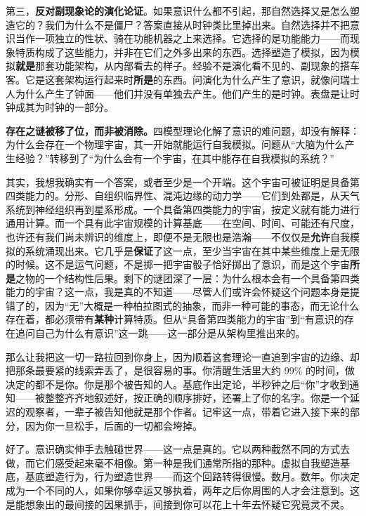 \documentclass[11pt, twoside, openright]{book}
\begin{document}
第三，\textbf{反对副现象论的演化论证}。如果意识什么都不引起，那自然选择又是怎么塑造它的？我们为什么不是僵尸？答案直接从时钟类比里掉出来。自然选择并不把意识当作一项独立的性状、骑在功能机器之上来选择。它选择的是功能能力------而现象特质构成了这些能力，并非在它们之外多出来的东西。选择塑造了模拟，因为模拟\textbf{就是}那套功能架构，从内部看去的样子。经验不是演化看不见的、副现象的搭车客。它是这套架构运行起来时\textbf{所是}的东西。问演化为什么产生了意识，就像问瑞士人为什么产生了钟面------他们并没有单独去产生。他们产生的是时钟。表盘是让时钟成其为时钟的一部分。

\textbf{存在之谜被移了位，而非被消除。}四模型理论化解了意识的难问题，却没有解释：为什么会存在一个物理宇宙，其一开始就能运行自我模拟。问题从“大脑为什么产生经验？”转移到了“为什么会有一个宇宙，在其中能存在自我模拟的系统？”

其实，我想我确实有一个答案，或者至少是一个开端。这个宇宙可被证明是具备第四类能力的。分形、自组织临界性、混沌边缘的动力学------它们到处都是，从天气系统到神经组织再到星系形成。一个具备第四类能力的宇宙，按定义就有能力进行通用计算。而一个具有此宇宙规模的计算基底------在空间、时间、可能还有尺度，也许还有我们尚未辨识的维度上，即便不是无限也是浩瀚------不仅仅是\textbf{允许}自我模拟的系统涌现出来。它几乎是\textbf{保证}了这一点，至少当宇宙在其中某些维度上是无限的时候。这不是运气问题，不是掷一把宇宙骰子恰好掷出了意识，而是这个宇宙\textbf{所是}之物的一个结构性后果。剩下的谜团深了一层：为什么根本会有一个具备第四类能力的宇宙？这一点，我是真的不知道------尽管人们或许会怀疑这个问题本身是提错了的，因为“无”大概是一种柏拉图式的抽象，而非一种可能的事态，而无论什么存在着，都必须带有\textbf{某种}计算特质。但从“具备第四类能力的宇宙”到“有意识的存在追问自己为什么有意识”这一跳------这一部分是从架构里推出来的。

那么让我把这一切一路拉回到你身上，因为顺着这套理论一直追到宇宙的边缘、却把那条最要紧的线索弄丢了，是很容易的事。你清醒生活里大约 99\% 的时间，做决定的都不是你。你是那个被告知的人。基底作出定论，半秒钟之后“你”才收到通知------被整整齐齐地叙述好，按正确的顺序排好，还署上了你的名字。你是一个延迟的观察者，一辈子被告知他就是那个作者。记牢这一点，带着它进入接下来的部分，因为你一旦松手，后面的一切都会垮掉。

好了。意识确实伸手去触碰世界------这一点是真的。它以两种截然不同的方式去做，而它们感受起来毫不相像。第一种是我们通常所指的那种。虚拟自我塑造基底，基底塑造行为，行为塑造世界------而这个回路转得很慢。数月。数年。你决定成为一个不同的人，如果你够幸运又够执着，两年之后你周围的人才会注意到。这是能想象出的最间接的因果抓手，间接到你可以花上十年去怀疑它究竟灵不灵。
\end{document}
